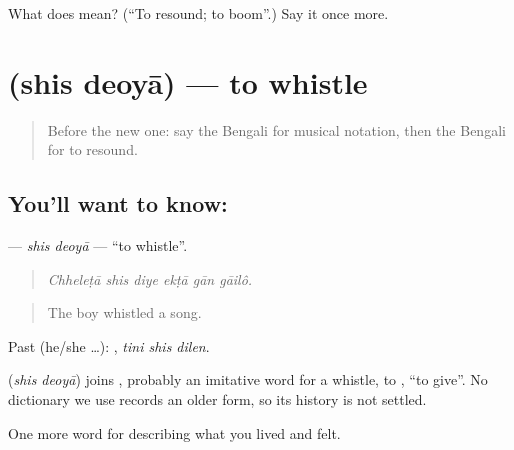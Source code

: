 \begin{tcolorbox}[breakable,colback=teal!4,colframe=teal!35!black,title={Before you move on}]
What does   mean? (\textquotedblleft{}To resound; to boom\textquotedblright{}.) Say it once more.
\end{tcolorbox}
\section[\texorpdfstring{\bn{শিস} \bn{দেওয়া} (shis deoyā)}{শিস দেওয়া (shis deoyā)}]{  (shis deoyā) — to whistle}

\label{lesson:BN-C525-shis-deoya}



\begin{quote}
Before the new one: say the Bengali for musical notation, then the Bengali for to resound.
\end{quote}

\subsection*{You'll want to know:  }
\textbf{ } — \emph{shis deoyā} — \textquotedblleft{}to whistle\textquotedblright{}.

\begin{quote}
     
\end{quote}

\begin{quote}
\emph{Chheleṭā shis diye ekṭā gān gāilô.}
\end{quote}

\begin{quote}
The boy whistled a song.
\end{quote}

Past (he/she …):   , \emph{tini shis dilen}.

\begin{cousinweb}
\textbf{ } (\emph{shis deoyā}) joins , probably an imitative word for a whistle, to , \textquotedblleft{}to give\textquotedblright{}. No dictionary we use records an older form, so its history is not settled.
\end{cousinweb}

\begin{grammarlens}[title={What you've built}]
One more word for describing what you lived and felt.
\end{grammarlens}

